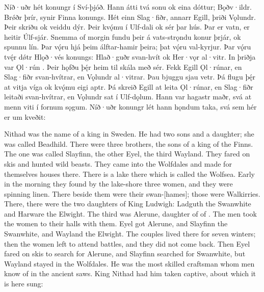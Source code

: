 \bpg\bpa{}%
Níð·uðr hét konungr í Sví-þjóð.
Hann átti tvá sonu ok eina dóttur;  Bǫðv·ildr.
Brǿðr  þrír, synir Finna konungs. Hét einn Slag·fiðr, annarr Egill, þriði Vǫlundr.
Þeir skriðu ok veiddu dýr. Þeir kvǫ́mu í Ulf-dali ok  sér þar hús.
Þar er vatn, er heitir Úlf-sjár.
Snemma of morgin fundu þeir á vats-strǫndu konur þrjár, ok spunnu lín. Þar vǫ́ru hjá þeim álftar-hamir þeira; þat vǫ́ru val-kyrjur.
Þar vǫ́ru tvę́r dǿtr Hlǫð·vés konungs: Hlað·guðr svan-hvít ok Her·vǫr al·vitr. In þriðja var Ǫl·rún .
Þeir hǫfðu þę́r heim til skála með sér. Fekk Egill Ǫl·rúnar, en Slag·fiðr svan-hvítrar, en Vǫlundr al·vitrar.
Þau bjuggu sjau vetr. Þá flugu þę́r at vitja víga ok kvǫ́mu eigi aptr.
Þá skreið Egill at leita Ǫl·rúnar, en Slag·fiðr leitaði svan-hvítrar, en Vǫlundr sat í Ulf-dǫlum.
Hann var hagastr maðr, svá at menn viti í fornum sǫgum.
Níð·uðr konungr lét hann hǫndum taka, svá sem hér er um kveðit:\epa

\bpb Nithad was the name of a king in Sweden.  He had two sons and a daughter; she was called Beadhild.
There were three brothers, the sons of a king of the Finns.  The one was called Slayfinn, the other Eyel, the third Wayland.
They fared on skis and hunted wild beasts. They came into the Wolfdales and made for themselves houses there.
There is a lake there which is called the Wolfsea.
Early in the morning they found by the lake-shore three women, and they were spinning linen. There beside them were their swan-[hames]; those were Walkirries.
There, there were the two daughters of King Ludwigh: Ladguth the Swanwhite and Harware the Elwight.  The third was Alerune, daughter of  of .
The men took the women to their halls with them.  Eyel got Alerune, and Slayfinn the Swanwhite, and Wayland the Elwight.
The couples lived there for seven winters; then the women left to attend battles, and they did not come back.
Then Eyel fared on skis to search for Alerune, and Slayfinn searched for Swanwhite, but Wayland stayed in the Wolfdales.
He was the most skilled craftsman whom men know of in the ancient saws. King Nithad had him taken captive, about which it is here sung:\epb\epg

